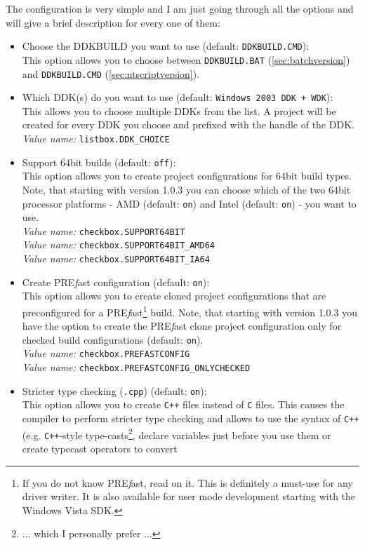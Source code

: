 \documentclass[a4paper,titlepage]{report}
\newcommand{\default}[1]{\textcolor[gray]{0.40}{(default: \texttt{#1})}}
\newcommand{\option}[1]{\textcolor[rgb]{0.00,0.20,0.20}{\textsf{#1}}}
\newcommand{\optiondeco}[1]{#1\vspace{0.1cm}}
\newcommand{\inioption}[1]{\\\textcolor[rgb]{0.00,0.00,0.40}{\textsl{Value name:} \texttt{#1}}}
\newcommand{\prefast}[0]{\textsf{PRE\textsl{f}ast}}
\begin{document}
The configuration is very simple and I am just going through all the
options and will give a brief description for every one of them:
\begin{itemize}
  \item \optiondeco{\option{Choose the DDKBUILD you want to use} \default{DDKBUILD.CMD}:}\\
  This option allows you to choose between \texttt{DDKBUILD.BAT} (\autoref{sec:batchversion})
  and \texttt{DDKBUILD.CMD} (\autoref{sec:ntscriptversion}).
  \item \optiondeco{\option{Which DDK(s) do you want to use} \default{Windows 2003 DDK + WDK}:}\\
  This allows you to choose multiple DDKs from the list.
  A project will be created for every DDK you choose and prefixed with
  the handle of the DDK.
  \inioption{listbox.DDK\_CHOICE}
  \item \optiondeco{\option{Support 64bit builds} \default{off}:}\\
  This option allows you to create project configurations for
  64bit build types.
  Note, that starting with version 1.0.3 you can choose which of the two 64bit
  processor platforms - AMD \default{on} and Intel \default{on} - you want to use.
  \inioption{checkbox.SUPPORT64BIT}
  \inioption{checkbox.SUPPORT64BIT\_AMD64}
  \inioption{checkbox.SUPPORT64BIT\_IA64}
  \item \optiondeco{\option{Create \prefast{} configuration} \default{on}:}\\
  This option allows you to create cloned project configurations that
  are preconfigured for a \prefast{}\footnote{If you do not know \prefast{}, read on it.
  This is definitely a must-use for any driver writer. It is also available
  for user mode development starting with the Windows Vista SDK.} build.
  Note, that starting with version 1.0.3 you have the option to create the \prefast{}
  clone project configuration only for checked build configurations \default{on}.
  \inioption{checkbox.PREFASTCONFIG}
  \inioption{checkbox.PREFASTCONFIG\_ONLYCHECKED}
  \item \optiondeco{\option{Stricter type checking (\texttt{.cpp})} \default{on}:}\\
  This option allows you to create \texttt{C++} files instead of \texttt{C} files.
  This causes the compiler to perform stricter type checking and
  allows to use the syntax of \texttt{C++} (e.g. \texttt{C++}-style
  type-casts\footnote{... which I personally prefer ...}, declare
  variables just before you use them or create typecast operators to convert

\end{itemize}
\end{document}
